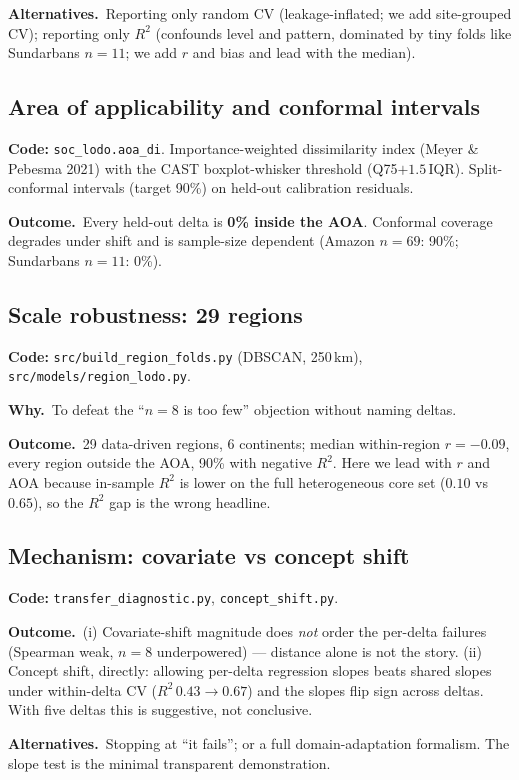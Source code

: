 \documentclass[11pt]{article}
\newcommand{\file}[1]{\texttt{\small #1}}
\newcommand{\why}{\textbf{\color{nb}Why.}\ }
\newcommand{\out}{\textbf{\color{nb}Outcome.}\ }
\newcommand{\alt}{\textbf{\color{nb}Alternatives.}\ }
\begin{document}
\alt Reporting only random CV (leakage-inflated; we add site-grouped CV); reporting only $R^2$
(confounds level and pattern, dominated by tiny folds like Sundarbans $n=11$; we add $r$ and
bias and lead with the median).

\subsection{Area of applicability and conformal intervals}
\textbf{Code:} \file{soc\_lodo.aoa\_di}. Importance-weighted dissimilarity index (Meyer \&
Pebesma 2021) with the CAST boxplot-whisker threshold (Q75$+1.5\,$IQR). Split-conformal
intervals (target 90\%) on held-out calibration residuals.

\out Every held-out delta is \textbf{0\% inside the AOA}. Conformal coverage degrades under
shift and is sample-size dependent (Amazon $n{=}69$: 90\%; Sundarbans $n{=}11$: 0\%).

\subsection{Scale robustness: 29 regions}
\textbf{Code:} \file{src/build\_region\_folds.py} (DBSCAN, 250\,km), \file{src/models/region\_lodo.py}.

\why To defeat the ``$n{=}8$ is too few'' objection without naming deltas.

\out 29 data-driven regions, 6 continents; median within-region $r=-0.09$, every region
outside the AOA, 90\% with negative $R^2$. Here we lead with $r$ and AOA because in-sample
$R^2$ is lower on the full heterogeneous core set ($0.10$ vs $0.65$), so the $R^2$ gap is the
wrong headline.

\subsection{Mechanism: covariate vs concept shift}
\textbf{Code:} \file{transfer\_diagnostic.py}, \file{concept\_shift.py}.

\out (i) Covariate-shift magnitude does \emph{not} order the per-delta failures (Spearman
weak, $n{=}8$ underpowered) --- distance alone is not the story. (ii) Concept shift, directly:
allowing per-delta regression slopes beats shared slopes under within-delta CV ($R^2\,0.43\to0.67$)
and the slopes flip sign across deltas. With five deltas this is suggestive, not conclusive.

\alt Stopping at ``it fails''; or a full domain-adaptation formalism. The slope test is the
minimal transparent demonstration.
\end{document}

